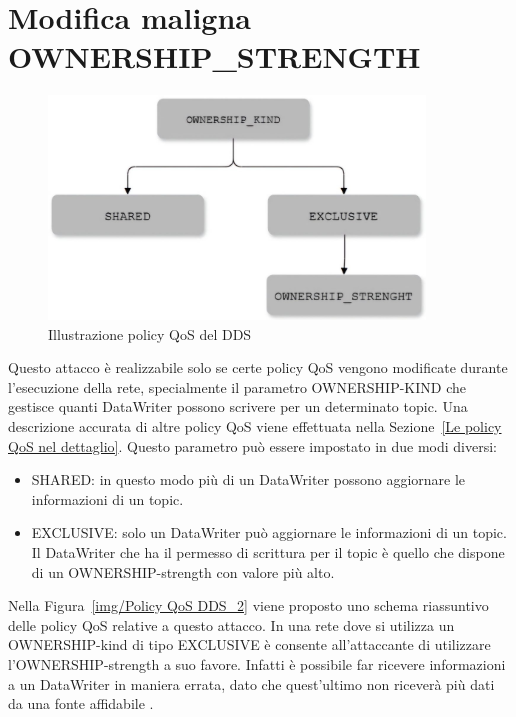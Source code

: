 \section{Modifica maligna OWNERSHIP\_STRENGTH}

\begin{figure}[H]
    \centering
    \includegraphics[width=10cm, keepaspectratio]{img/Policy QoS DDS_2.jpg}
    \caption{Illustrazione policy QoS del DDS}\label{Mappa QoS}
\end{figure}
\label{img/Policy QoS DDS_2}


Questo attacco è realizzabile solo se certe policy QoS vengono
modificate durante l'esecuzione della rete, specialmente il parametro
OWNERSHIP-KIND che gestisce quanti DataWriter possono scrivere per un
determinato topic. Una descrizione accurata di altre policy QoS viene 
effettuata nella Sezione~\ref{Le policy QoS nel dettaglio}.
Questo parametro può essere impostato in due modi diversi:
\begin{itemize}
    \item SHARED: in questo modo più di un DataWriter possono aggiornare le
    informazioni di un topic.
    \item EXCLUSIVE: solo un DataWriter può aggiornare le informazioni di un
    topic. Il DataWriter che ha il permesso di scrittura per il topic è quello
    che dispone di un OWNERSHIP-strength con valore più alto.
\end{itemize}
Nella Figura~\ref{img/Policy QoS DDS_2} viene proposto uno schema riassuntivo
delle policy QoS relative a questo attacco.
In una rete dove si utilizza un OWNERSHIP-kind di tipo EXCLUSIVE è consente
all'attaccante di utilizzare l'OWNERSHIP-strength a suo favore.
Infatti è possibile far ricevere informazioni a un DataWriter
in maniera errata, dato che quest'ultimo non riceverà più dati da
una fonte affidabile 
\cite{DBLP:conf/malware/MichaudDL18}.


